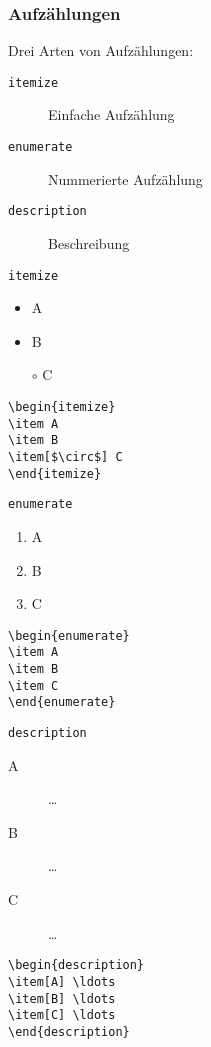 \begin{frame}[c,fragile]
\frametitle{Aufz\"ahlungen}

Drei Arten von Aufzählungen:
\begin{description}
\item[\texttt{itemize}] Einfache Aufz\"ahlung
\item[\texttt{enumerate}] Nummerierte Aufz\"ahlung
\item[\texttt{description}] Beschreibung
\end{description}

\begin{minipage}{0.3\textwidth}
\begin{block}{\texttt{itemize}}
\begin{itemize}
\item A
\item B
\item[$\circ$] C
\end{itemize}
\begin{verbatim}
\begin{itemize}
\item A
\item B
\item[$\circ$] C
\end{itemize}
\end{verbatim}
\end{block}
\end{minipage}
\hfill
\begin{minipage}{0.3\textwidth}
\begin{block}{\texttt{enumerate}}
\begin{enumerate}
\item A
\item B
\item C
\end{enumerate}
\begin{verbatim}
\begin{enumerate}
\item A
\item B
\item C
\end{enumerate}
\end{verbatim}
\end{block}
\end{minipage}
\hfill
\begin{minipage}{0.3\textwidth}
\begin{block}{\texttt{description}}
\begin{description}
\item[A] \ldots
\item[B] \ldots
\item[C] \ldots
\end{description}
\begin{verbatim}
\begin{description}
\item[A] \ldots
\item[B] \ldots
\item[C] \ldots
\end{description}
\end{verbatim}
\end{block}
\end{minipage}


\end{frame}
